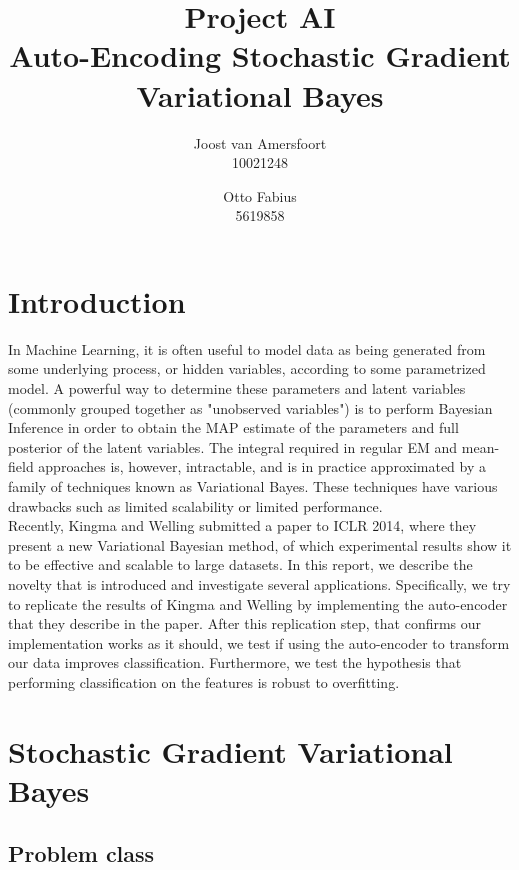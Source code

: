 \documentclass{article}
\begin{document}
\title{Project AI \\ Auto-Encoding Stochastic Gradient Variational Bayes}
\author{	
	Joost van Amersfoort \\ 10021248  
	\and
	Otto Fabius \\ 5619858
	}
\maketitle

\section{Introduction}

In Machine Learning, it is often useful to model data as being generated from some underlying process, or hidden variables, according to some parametrized model. A powerful way to determine these parameters and latent variables (commonly grouped together as "unobserved variables") is to perform Bayesian Inference in order to obtain the MAP estimate of the parameters and full posterior of the latent variables. The integral required in regular EM and mean-field approaches is, however, intractable, and is in practice approximated by a family of techniques known as Variational Bayes. These techniques have various drawbacks such as limited scalability or limited performance. \\
Recently, Kingma and Welling \cite{kingma2013auto} submitted a paper to ICLR 2014, where they present a new Variational Bayesian method, of which experimental results show it to be effective and scalable to large datasets. In this report, we describe the novelty that is introduced and investigate several applications. Specifically, we try to replicate the results of Kingma and Welling by implementing the auto-encoder that they describe in the paper. After this replication step, that confirms our implementation works as it should, we test if using the auto-encoder to transform our data improves classification. Furthermore, we test the hypothesis that performing classification on the features is robust to overfitting. 

\section{Stochastic Gradient Variational Bayes}

\subsection{Problem class}
\end{document}
